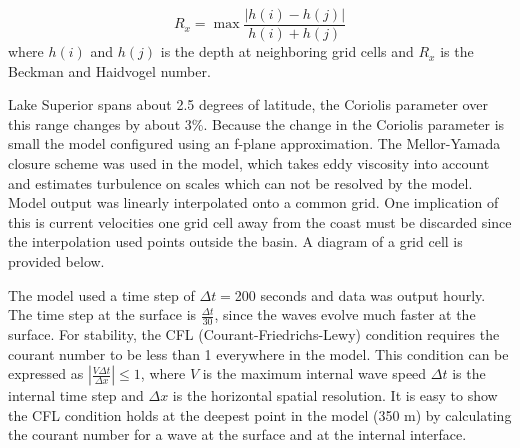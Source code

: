 \begin{equation}
	R_x=\max \frac{| h(i)-h(j) |}{h(i)+h(j)}
\end{equation}
where $h(i)$ and $h(j)$ is the depth at neighboring grid cells and $R_x$ is the Beckman and Haidvogel number.

Lake Superior spans about 2.5 degrees of latitude, the Coriolis parameter over this range changes by about 3\%. Because the change in the Coriolis parameter is small the model
configured using an f-plane approximation. The Mellor-Yamada closure scheme was used in the model, which takes eddy viscosity into account and estimates turbulence 
on scales which can not be resolved by the model. Model output was  linearly interpolated onto a common grid. One implication of this is current velocities one grid cell away from the coast
must be discarded since the interpolation used points outside the basin. A diagram of a grid cell is provided below. 


The model used a time step of $\Delta t = $200 seconds and data was output hourly.  The time step at the surface is $\frac{\Delta t}{30}$, since the waves evolve much faster at the surface. 
For stability, the CFL (Courant-Friedrichs-Lewy) condition requires the  courant number to be less than 1 everywhere in the model. This condition can be expressed as
 $|\frac{V\Delta t}{\Delta x}| \le 1$, where $V$ is the maximum internal wave speed $\Delta t$ is the internal time step  and $\Delta x$ is the horizontal spatial resolution. 
 It is easy to show the CFL condition holds at the deepest point in the model (350 m) by calculating the courant number for a wave at the surface and at the internal interface. 

